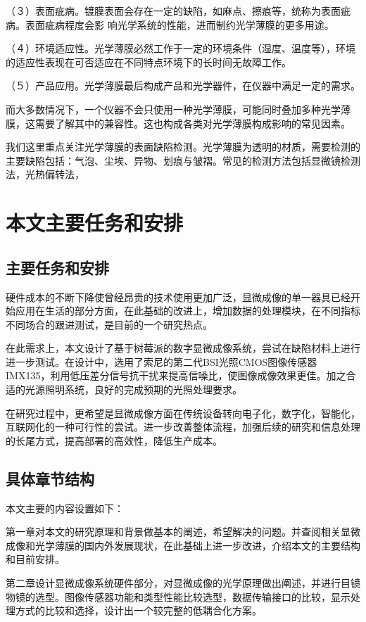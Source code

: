 （３）表面疵病。镀膜表面会存在一定的缺陷，如麻点、擦痕等，统称为表面疵病。表面疵病程度会影
响光学系统的性能，进而制约光学薄膜的更多用途。

（４）环境适应性。光学薄膜必然工作于一定的环境条件（湿度、温度等），环境的适应性表现在可否适应在不同特点环境下的长时间无故障工作。

（５）产品应用。光学薄膜最后构成产品和光学器件，在仪器中满足一定的需求。

而大多数情况下，一个仪器不会只使用一种光学薄膜，可能同时叠加多种光学薄膜，这需要了解其中的兼容性。这也构成各类对光学薄膜构成影响的常见因素。

我们这里重点关注光学薄膜的表面缺陷检测。光学薄膜为透明的材质，需要检测的主要缺陷包括：气泡、尘埃、异物、划痕与皱褶。常见的检测方法包括显微镜检测法，光热偏转法，

\section{本文主要任务和安排}
\subsection{主要任务和安排}
硬件成本的不断下降使曾经昂贵的技术使用更加广泛，显微成像的单一器具已经开始应用在生活的部分方面，在此基础的改进上，增加数据的处理模块，在不同指标不同场合的跟进测试，是目前的一个研究热点。

在此需求上，本文设计了基于树莓派的数字显微成像系统，尝试在缺陷材料上进行进一步测试。在设计中，选用了索尼的第二代BSI光照CMOS图像传感器IMX135，利用低压差分信号抗干扰来提高信噪比，使图像成像效果更佳。加之合适的光源照明系统，良好的完成预期的光照处理要求。

在研究过程中，更希望是显微成像方面在传统设备转向电子化，数字化，智能化，互联网化的一种可行性的尝试。进一步改善整体流程，加强后续的研究和信息处理的长尾方式，提高部署的高效性，降低生产成本。

	
\subsection{具体章节结构}

本文主要的内容设置如下：

第一章对本文的研究原理和背景做基本的阐述，希望解决的问题。并查阅相关显微成像和光学薄膜的国内外发展现状，在此基础上进一步改进，介绍本文的主要结构和目前安排。

第二章设计显微成像系统硬件部分，对显微成像的光学原理做出阐述，并进行目镜物镜的选型。图像传感器功能和类型性能比较选型，数据传输接口的比较，显示处理方式的比较和选择，设计出一个较完整的低耦合化方案。

